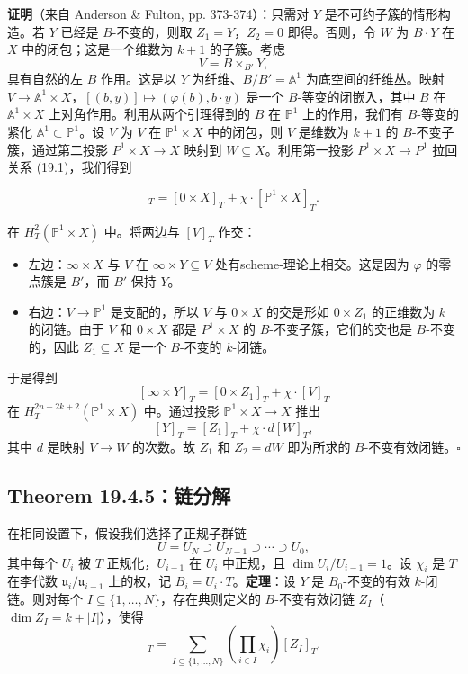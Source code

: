 \textbf{证明}（来自 Anderson \& Fulton, pp. 373-374）：只需对 $Y$ 是不可约子簇的情形构造。若 $Y$ 已经是 $B$-不变的，则取 $Z_1 = Y$，$Z_2 = 0$ 即得。否则，令 $W$ 为 $B \cdot Y$ 在 $X$ 中的闭包；这是一个维数为 $k+1$ 的子簇。考虑\[V = B \times_{B'} Y,\]具有自然的左 $B$ 作用。这是以 $Y$ 为纤维、$B/B' = \mathbb{A}^1$ 为底空间的纤维丛。映射 $V \to \mathbb{A}^1 \times X$，$[(b,y)] \mapsto (\varphi(b), b \cdot y)$ 是一个 $B$-等变的闭嵌入，其中 $B$ 在 $\mathbb{A}^1 \times X$ 上对角作用。利用从两个引理得到的 $B$ 在 $\mathbb{P}^1$ 上的作用，我们有 $B$-等变的紧化 $\mathbb{A}^1 \subset \mathbb{P}^1$。设 $V$ 为 $V$ 在 $\mathbb{P}^1 \times X$ 中的闭包，则 $V$ 是维数为 $k+1$ 的 $B$-不变子簇，通过第二投影 $P^1 \times X \to X$ 映射到 $W \subseteq X$。利用第一投影 $P^1 \times X \to P^1$ 拉回关系 (19.1)，我们得到

\begin{equation}
[\infty \times X]_T = [0 \times X]_T + \chi \cdot [\mathbb{P}^1 \times X]_T.
\label{eq:P1ProductRelation}
\end{equation}

在 $H_T^2(\mathbb{P}^1 \times X)$ 中。将两边与 $[V]_T$ 作交：
\begin{itemize}
\item 左边：$\infty \times X$ 与 $V$ 在 $\infty \times Y \subseteq V$ 处有scheme-理论上相交。这是因为 $\varphi$ 的零点簇是 $B'$，而 $B'$ 保持 $Y$。\item 右边：$V \to \mathbb{P}^1$ 是支配的，所以 $V$ 与 $0 \times X$ 的交是形如 $0 \times Z_1$ 的正维数为 $k$ 的闭链。由于 $V$ 和 $0 \times X$ 都是 $P^1 \times X$ 的 $B$-不变子簇，它们的交也是 $B$-不变的，因此 $Z_1 \subseteq X$ 是一个 $B$-不变的 $k$-闭链。
\end{itemize}于是得到\[[\infty \times Y]_T = [0 \times Z_1]_T + \chi \cdot [V]_T\]在 $H_T^{2n-2k+2}(\mathbb{P}^1 \times X)$ 中。通过投影 $\mathbb{P}^1 \times X \to X$ 推出\[[Y]_T = [Z_1]_T + \chi \cdot d[W]_T,\]其中 $d$ 是映射 $V \to W$ 的次数。故 $Z_1$ 和 $Z_2 = dW$ 即为所求的 $B$-不变有效闭链。$\square$
\subsection{Theorem 19.4.5：链分解}在相同设置下，假设我们选择了正规子群链\[U = U_N \supset U_{N-1} \supset \cdots \supset U_0,\]其中每个 $U_i$ 被 $T$ 正规化，$U_{i-1}$ 在 $U_i$ 中正规，且 $\dim U_i/U_{i-1} = 1$。设 $\chi_i$ 是 $T$ 在李代数 $\mathfrak{u}_i/\mathfrak{u}_{i-1}$ 上的权，记 $B_i = U_i \cdot T$。\textbf{定理}：设 $Y$ 是 $B_0$-不变的有效 $k$-闭链。则对每个 $I \subseteq \{1,\ldots,N\}$，存在典则定义的 $B$-不变有效闭链 $Z_I$（$\dim Z_I = k + |I|$），使得
\begin{equation}[Y]_T = \sum_{I \subseteq \{1,\ldots,N\}} \left(\prod_{i \in I} \chi_i\right) [Z_I]_T.
\label{eq:ChainDecomposition}
\end{equation}

